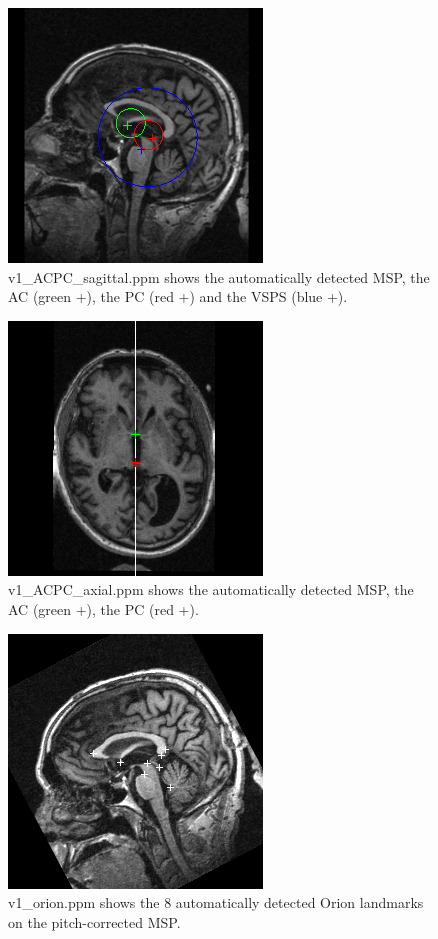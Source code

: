 \documentclass[11pt]{article}
\begin{document}
\begin{figure}[t!]
\begin{center}
\includegraphics[scale=1.0]{v1_ACPC_sagittal.jpg}
\caption{v1\_ACPC\_sagittal.ppm shows the automatically detected MSP, the AC (green +), 
the PC (red +) and the VSPS (blue +).  
}
\label{fig:sagittal}
\end{center}
\end{figure}
\begin{figure}[H]
\begin{center}
\includegraphics[scale=1.0]{v1_ACPC_axial.jpg}
\caption{v1\_ACPC\_axial.ppm shows the automatically detected MSP, the AC (green +), 
the PC (red +).
}
\label{fig:axial}
\end{center}
\end{figure}
\begin{figure}[H]
\begin{center}
\includegraphics[scale=1.0]{v1_orion.jpg}
\caption{v1\_orion.ppm shows the 8 automatically detected
Orion landmarks on the pitch-corrected MSP.
}
\label{fig:orion}
\end{center}
\end{figure}
\end{document}
